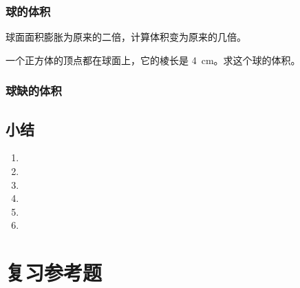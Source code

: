 \subsection{球的体积}
\begin{Practice}
  \begin{question}
    \item 球面面积膨胀为原来的二倍，计算体积变为原来的几倍。
    \item 一个正方体的顶点都在球面上，它的棱长是 \qty{4}{cm}。求这个球的体积。
  \end{question}
\end{Practice}
\subsection{球缺的体积}
\begin{Practice}
  \begin{question}
    \item 
    \item 
  \end{question}
\end{Practice}
\begin{Exercise}
  \begin{question}
    \item 
    \item 
    \item 
    \item 
    \item 
    \item 
    \item 
    \item 
    \item 
    \item 
    \item 
  \end{question}
\end{Exercise}

\section*{小结}
\begin{enumerate}[C、,itemindent=4.5em]
  \item 
  \item 
  \item 
  \item 
  \item 
  \item 
\end{enumerate}
\chapter*{复习参考题}
